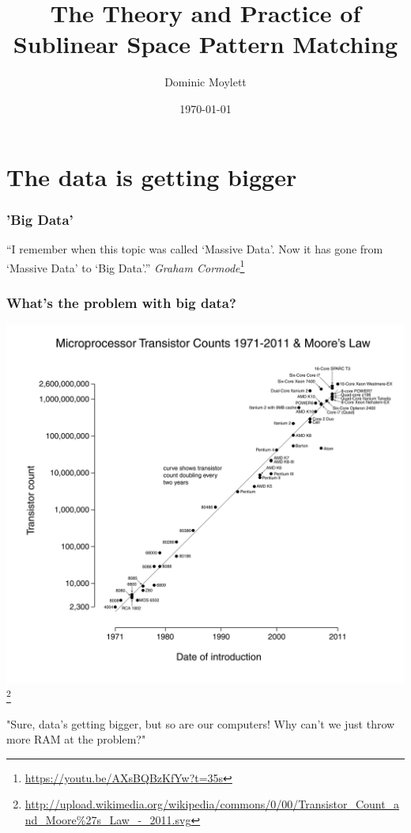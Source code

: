 \documentclass{beamer}
\title[Sublinear Space Pattern Matching]{The Theory and Practice of Sublinear Space Pattern Matching} %
\author{Dominic Moylett} %
\institute[University of Bristol] %
{
University of Bristol \\ %
\medskip
\textit{dominic.moylett.2011@my.bristol.ac.uk} %
}
\date{\today} %
\begin{document}
\begin{frame}
\titlepage %
\end{frame}


\section{The data is getting bigger}

\begin{frame}
\frametitle{'Big Data'}
``I remember when this topic was called `Massive Data'. Now it has gone from `Massive Data' to `Big Data'.''
\textit{Graham Cormode}\footnote{\url{https://youtu.be/AXsBQBzKfYw?t=35s}}
\end{frame}


\begin{frame}
\frametitle{What's the problem with big data?}
\begin{center}
\includegraphics[width=0.4\paperwidth]{moores_law}\footnote{\url{http://upload.wikimedia.org/wikipedia/commons/0/00/Transistor_Count_and_Moore\%27s_Law_-_2011.svg}}
\end{center}
"Sure, data's getting bigger, but so are our computers! Why can't we just throw more RAM at the problem?"
\end{frame}
\end{document}
